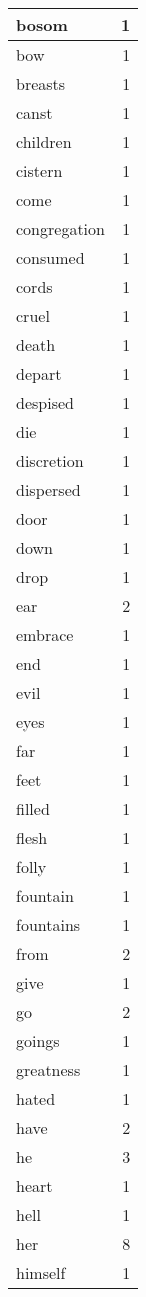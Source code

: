 \begin{center}
\begin{longtable}{l|r}
bosom & 1\\ \hline 
bow & 1\\ \hline 
breasts & 1\\ \hline 
canst & 1\\ \hline 
children & 1\\ \hline 
cistern & 1\\ \hline 
come & 1\\ \hline 
congregation & 1\\ \hline 
consumed & 1\\ \hline 
cords & 1\\ \hline 
cruel & 1\\ \hline 
death & 1\\ \hline 
depart & 1\\ \hline 
despised & 1\\ \hline 
die & 1\\ \hline 
discretion & 1\\ \hline 
dispersed & 1\\ \hline 
door & 1\\ \hline 
down & 1\\ \hline 
drop & 1\\ \hline 
ear & 2\\ \hline 
embrace & 1\\ \hline 
end & 1\\ \hline 
evil & 1\\ \hline 
eyes & 1\\ \hline 
far & 1\\ \hline 
feet & 1\\ \hline 
filled & 1\\ \hline 
flesh & 1\\ \hline 
folly & 1\\ \hline 
fountain & 1\\ \hline 
fountains & 1\\ \hline 
from & 2\\ \hline 
give & 1\\ \hline 
go & 2\\ \hline 
goings & 1\\ \hline 
greatness & 1\\ \hline 
hated & 1\\ \hline 
have & 2\\ \hline 
he & 3\\ \hline 
heart & 1\\ \hline 
hell & 1\\ \hline 
her & 8\\ \hline 
himself & 1\\ \hline 

\end{longtable}
\end{center}
